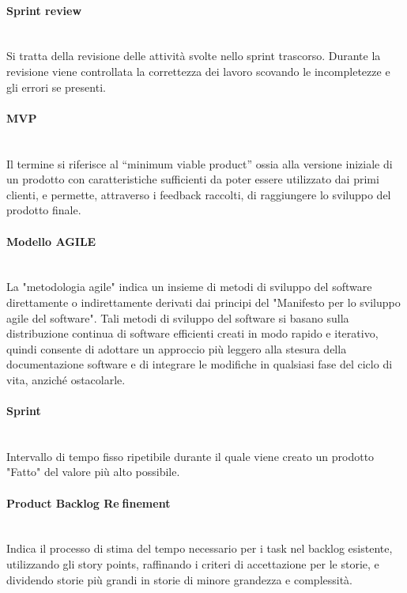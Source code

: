 \paragraph{Sprint review}~\smallskip \\
Si tratta della revisione delle attività svolte nello sprint trascorso. Durante la revisione viene controllata la correttezza
dei lavoro scovando le incompletezze e gli errori se presenti.

\paragraph{MVP}~\smallskip \\
Il termine si riferisce al “minimum viable product” ossia alla versione iniziale di un prodotto con 
caratteristiche sufficienti da poter essere utilizzato dai primi clienti, e permette, attraverso i feedback raccolti, di raggiungere lo sviluppo del prodotto finale.

\paragraph{Modello AGILE}~\smallskip \\
La "metodologia agile" indica un insieme di metodi di sviluppo del software direttamente o indirettamente derivati dai principi del "Manifesto per lo sviluppo agile del software".
Tali metodi di sviluppo del software si basano sulla distribuzione continua di software efficienti creati in modo rapido e iterativo, quindi
consente di adottare un approccio più leggero alla stesura della documentazione software e di integrare le modifiche in qualsiasi fase del ciclo di vita, anziché ostacolarle.

\paragraph{Sprint}~\smallskip \\
Intervallo di tempo fisso ripetibile durante il quale viene creato un prodotto "Fatto" del valore più alto possibile.

\paragraph{Product Backlog Refinement}~\smallskip \\
Indica il processo di stima del tempo necessario per i task nel backlog esistente, utilizzando gli story points, 
raffinando i criteri di accettazione per le storie, e dividendo storie più grandi in storie di minore grandezza e complessità.